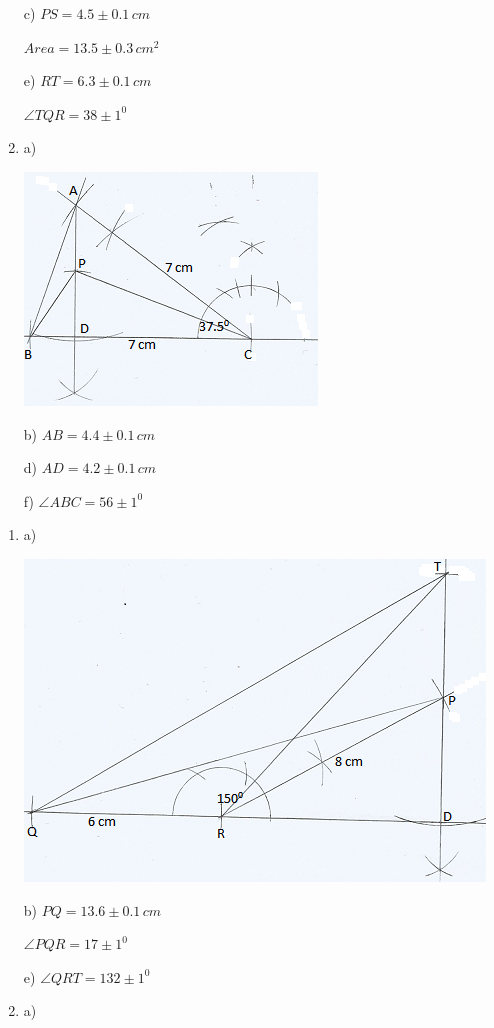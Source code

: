 \documentclass[
  a4paperpaper,
]{scrbook}
\begin{document}
\begin{tcolorbox}
\begin{enumerate}
  c) \(PS=4.5\pm 0.1\,cm\)

  \(Area=13.5 \pm0.3\,cm^2\)

  e) \(RT=6.3 \pm 0.1\,cm\)

  \(\angle TQR=38\pm1^0\)
\item
  a)

  \includegraphics{figures/Q4.png}

  b) \(AB=4.4\pm0.1\,cm\)

  d) \(AD=4.2 \pm0.1 \, cm\)

  f) \(\angle ABC=56\pm1^0\)
\end{enumerate}

\begin{enumerate}
\def\labelenumi{\arabic{enumi}.}
\setcounter{enumi}{4}
\item
  a)

  \includegraphics{figures/Q5.png}

  b) \(PQ=13.6\pm0.1 \,cm\)

  \(\angle PQR=17\pm1^0\)

  e) \(\angle QRT=132\pm 1^0\)
\item
  a)


\end{enumerate}
\end{tcolorbox}
\end{document}
